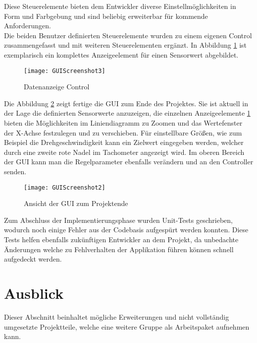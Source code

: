 
\newpage
{}
Diese Steuerelemente bieten dem Entwickler diverse Einstellmöglichkeiten in Form und Farbgebung und sind beliebig erweiterbar für kommende Anforderungen.\\

Die beiden Benutzer definierten Steuerelemente wurden zu einem eigenen Control zusammengefasst und mit weiteren Steuerelementen ergänzt. In Abbildung \ref{fig:control1} ist exemplarisch ein komplettes Anzeigeelement für einen Sensorwert abgebildet.

\begin{figure}[ht]
	\centering
		\texttt{[image: GUIScreenshot3]}
		\caption{Datenanzeige Control}
		\label{fig:control1}
\end{figure}

Die Abbildung \ref{fig:guifinal} zeigt fertige die GUI zum Ende des Projektes. Sie ist aktuell in der Lage die definierten Sensorwerte anzuzeigen, die einzelnen Anzeigeelemente \ref{fig:control1} bieten die Möglichkeiten im Liniendiagramm zu Zoomen und das Wertefenster der X-Achse festzulegen und zu verschieben. Für einstellbare Größen, wie zum Beispiel die Drehgeschwindigkeit kann ein Zielwert eingegeben werden, welcher durch eine zweite rote Nadel im Tachometer angezeigt wird. Im oberen Bereich der GUI kann man die Regelparameter ebenfalls verändern und an den Controller senden.

\begin{figure}[ht]
	\centering
		\texttt{[image: GUIScreenshot2]}
		\caption{Ansicht der GUI zum Projektende}
		\label{fig:guifinal}
\end{figure}

Zum Abschluss der Implementierungsphase wurden Unit-Tests geschrieben, wodurch noch einige Fehler aus der Codebasis aufgespürt werden konnten. Diese Tests helfen ebenfalls zukünftigen Entwickler an dem Projekt, da unbedachte Änderungen welche zu Fehlverhalten der Applikation führen können schnell aufgedeckt werden.

\section{Ausblick}
Dieser Abschnitt beinhaltet mögliche Erweiterungen und nicht vollständig umgesetzte Projektteile, welche eine weitere Gruppe als Arbeitspaket aufnehmen kann. 

